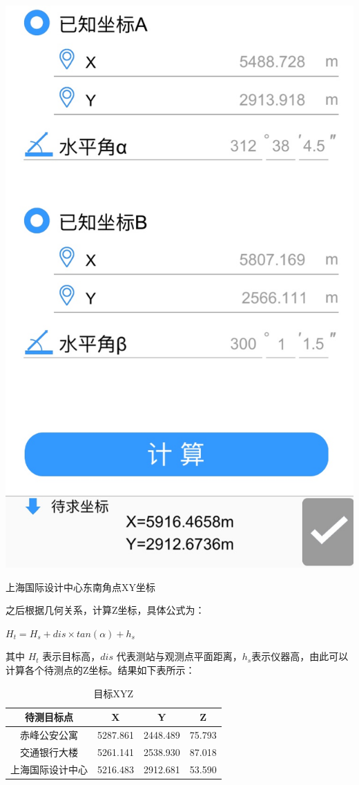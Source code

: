 \documentclass[a4paper,16pt,UTF8]{article}
\begin{document}
\begin{center}
    \includegraphics[scale = 0.45]{uhue.jpg}
    
    上海国际设计中心东南角点XY坐标
\end{center}

之后根据几何关系，计算Z坐标，具体公式为：

\begin{center}
    $H_{t} = H_{s} + dis \times tan(\alpha) + h_{s} $
\end{center}
其中 $H_{t}$ 表示目标高，$dis$ 代表测站与观测点平面距离，$h_{s}$表示仪器高，由此可以计算各个待测点的Z坐标。结果如下表所示：

\begin{longtable}{|c|c|c|c|}
    \caption{目标XYZ} \\ \hline
    待测目标点 & X & Y & Z \\ \hline
    赤峰公安公寓 & 5287.861 & 2448.489 & 75.793 \\ \hline
    交通银行大楼 & 5261.141 & 2538.930 & 87.018 \\ \hline
    上海国际设计中心 & 5216.483 & 2912.681 & 53.590\\ \hline
\end{longtable}
\end{document}
